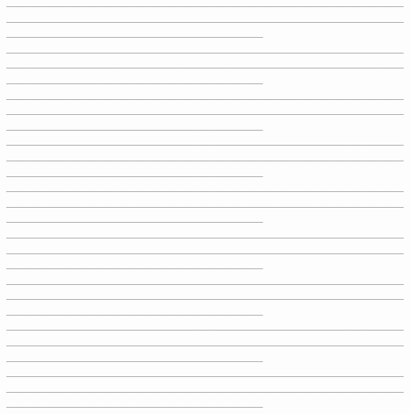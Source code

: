 \documentclass[12pt]{article}
\begin{document}
\_\_\_\_\_\_\_\_\_\_\_\_\_\_\_\_\_\_\_\_\_\_\_\_\_\_\_\_\_\_\_\_\_\_\_\_\_\_\_\_\_\_\_\_\_\_\_\_\_\_\_\_\_\_\_\_\_\_\_\_\_\_\_\_\_\_\_\_\_\_\_\_\_\_\_\_\_\_\_\_\_\_\_\_\_\_\_\_\_\_\_\_\_\_\_\_\_\_\_\_\_\_\_\_\_\_\_\_\_\_\_\_\_\_\_\_\_\_\_\_\_\_\_\_\_\_\_ \\\_\_\_\_\_\_\_\_\_\_\_\_\_\_\_\_\_\_\_\_\_\_\_\_\_\_\_\_\_\_\_\_\_\_\_\_\_\_\_\_\_\_\_\_\_\_\_\_\_\_\_\_\_\_\_\_\_\_\_\_\_\_\_\_\_\_\_\_\_\_\_\_\_\_\_\_\_\_\_\_\_\_\_\_\_\_\_\_\_\_\_\_\_\_\_\_\_\_\_\_\_\_\_\_\_\_\_\_\_\_\_\_\_\_\_\_\_\_\_\_\_\_\_\_\_\_\_ \\\_\_\_\_\_\_\_\_\_\_\_\_\_\_\_\_\_\_\_\_\_\_\_\_\_\_\_\_\_\_\_\_\_\_\_\_\_\_\_\_\_\_\_\_\_\_\_\_\_\_\_\_\_\_\_\_\_\_\_\_\_\_\_\_\_\_\_\_\_\_\_\_\_\_\_\_\_\_\_\_\_\_\_\_\_\_\_\_\_\_\_\_\_\_\_\_\_\_\_\_\_\_\_\_\_\_\_\_\_\_\_\_\_\_\_\_\_\_\_\_\_\_\_\_\_\_\_ \\\_\_\_\_\_\_\_\_\_\_\_\_\_\_\_\_\_\_\_\_\_\_\_\_\_\_\_\_\_\_\_\_\_\_\_\_\_\_\_\_\_\_\_\_\_\_\_\_\_\_\_\_\_\_\_\_\_\_\_\_\_\_\_\_\_\_\_\_\_\_\_\_\_\_\_\_\_\_\_\_\_\_\_\_\_\_\_\_\_\_\_\_\_\_\_\_\_\_\_\_\_\_\_\_\_\_\_\_\_\_\_\_\_\_\_\_\_\_\_\_\_\_\_\_\_\_\_ \\\_\_\_\_\_\_\_\_\_\_\_\_\_\_\_\_\_\_\_\_\_\_\_\_\_\_\_\_\_\_\_\_\_\_\_\_\_\_\_\_\_\_\_\_\_\_\_\_\_\_\_\_\_\_\_\_\_\_\_\_\_\_\_\_\_\_\_\_\_\_\_\_\_\_\_\_\_\_\_\_\_\_\_\_\_\_\_\_\_\_\_\_\_\_\_\_\_\_\_\_\_\_\_\_\_\_\_\_\_\_\_\_\_\_\_\_\_\_\_\_\_\_\_\_\_\_\_ \\\_\_\_\_\_\_\_\_\_\_\_\_\_\_\_\_\_\_\_\_\_\_\_\_\_\_\_\_\_\_\_\_\_\_\_\_\_\_\_\_\_\_\_\_\_\_\_\_\_\_\_\_\_\_\_\_\_\_\_\_\_\_\_\_\_\_\_\_\_\_\_\_\_\_\_\_\_\_\_\_\_\_\_\_\_\_\_\_\_\_\_\_\_\_\_\_\_\_\_\_\_\_\_\_\_\_\_\_\_\_\_\_\_\_\_\_\_\_\_\_\_\_\_\_\_\_\_ \\\_\_\_\_\_\_\_\_\_\_\_\_\_\_\_\_\_\_\_\_\_\_\_\_\_\_\_\_\_\_\_\_\_\_\_\_\_\_\_\_\_\_\_\_\_\_\_\_\_\_\_\_\_\_\_\_\_\_\_\_\_\_\_\_\_\_\_\_\_\_\_\_\_\_\_\_\_\_\_\_\_\_\_\_\_\_\_\_\_\_\_\_\_\_\_\_\_\_\_\_\_\_\_\_\_\_\_\_\_\_\_\_\_\_\_\_\_\_\_\_\_\_\_\_\_\_\_ \\\_\_\_\_\_\_\_\_\_\_\_\_\_\_\_\_\_\_\_\_\_\_\_\_\_\_\_\_\_\_\_\_\_\_\_\_\_\_\_\_\_\_\_\_\_\_\_\_\_\_\_\_\_\_\_\_\_\_\_\_\_\_\_\_\_\_\_\_\_\_\_\_\_\_\_\_\_\_\_\_\_\_\_\_\_\_\_\_\_\_\_\_\_\_\_\_\_\_\_\_\_\_\_\_\_\_\_\_\_\_\_\_\_\_\_\_\_\_\_\_\_\_\_\_\_\_\_ \\\_\_\_\_\_\_\_\_\_\_\_\_\_\_\_\_\_\_\_\_\_\_\_\_\_\_\_\_\_\_\_\_\_\_\_\_\_\_\_\_\_\_\_\_\_\_\_\_\_\_\_\_\_\_\_\_\_\_\_\_\_\_\_\_\_\_\_\_\_\_\_\_\_\_\_\_\_\_\_\_\_\_\_\_\_\_\_\_\_\_\_\_\_\_\_\_\_\_\_\_\_\_\_\_\_\_\_\_\_\_\_\_\_\_\_\_\_\_\_\_\_\_\_\_\_\_\_
\end{document}
